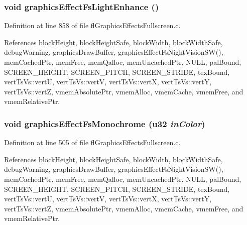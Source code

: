 \subsubsection{\setlength{\rightskip}{0pt plus 5cm}void graphics\-Effect\-Fs\-Light\-Enhance ()}\label{flGraphicsEffectsFullscreen_8h_628dc4ec92338d4544b60a4a90e37fd5}




Definition at line 858 of file fl\-Graphics\-Effects\-Fullscreen.c.

References block\-Height, block\-Height\-Safe, block\-Width, block\-Width\-Safe, debug\-Warning, graphics\-Draw\-Buffer, graphics\-Effect\-Fs\-Night\-Vision\-SW(), mem\-Cached\-Ptr, mem\-Free, mem\-Qalloc, mem\-Uncached\-Ptr, NULL, pal\-Bound, SCREEN\_\-HEIGHT, SCREEN\_\-PITCH, SCREEN\_\-STRIDE, tex\-Bound, vert\-Ts\-Vs::vert\-U, vert\-Ts\-Vs::vert\-V, vert\-Ts\-Vs::vert\-X, vert\-Ts\-Vs::vert\-Y, vert\-Ts\-Vs::vert\-Z, vmem\-Absolute\-Ptr, vmem\-Alloc, vmem\-Cache, vmem\-Free, and vmem\-Relative\-Ptr.
\subsubsection{\setlength{\rightskip}{0pt plus 5cm}void graphics\-Effect\-Fs\-Monochrome (u32 {\em in\-Color})}\label{flGraphicsEffectsFullscreen_8h_7f31d631662d7e8c81e3c669eaaa1384}




Definition at line 505 of file fl\-Graphics\-Effects\-Fullscreen.c.

References block\-Height, block\-Height\-Safe, block\-Width, block\-Width\-Safe, debug\-Warning, graphics\-Draw\-Buffer, graphics\-Effect\-Fs\-Night\-Vision\-SW(), mem\-Cached\-Ptr, mem\-Free, mem\-Qalloc, mem\-Uncached\-Ptr, NULL, pal\-Bound, SCREEN\_\-HEIGHT, SCREEN\_\-PITCH, SCREEN\_\-STRIDE, tex\-Bound, vert\-Ts\-Vs::vert\-U, vert\-Ts\-Vs::vert\-V, vert\-Ts\-Vs::vert\-X, vert\-Ts\-Vs::vert\-Y, vert\-Ts\-Vs::vert\-Z, vmem\-Absolute\-Ptr, vmem\-Alloc, vmem\-Cache, vmem\-Free, and vmem\-Relative\-Ptr.
